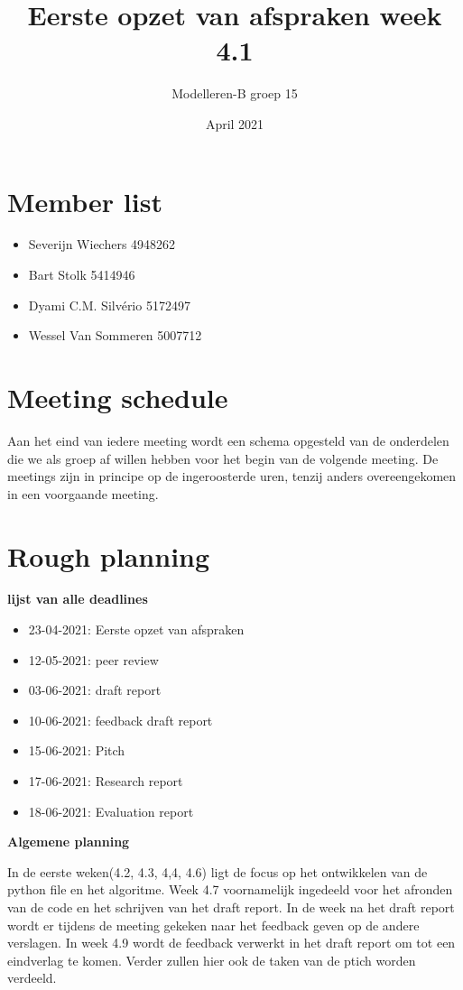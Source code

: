 \documentclass{article}
\title{Eerste opzet van afspraken week 4.1}
\author{Modelleren-B groep 15}
\date{April 2021}
\begin{document}
\maketitle

\section*{Member list}

\begin{itemize}
    \item Severijn Wiechers 4948262
    \item Bart Stolk 5414946
    \item Dyami C.M. Silvério 5172497
    \item Wessel Van Sommeren 5007712
\end{itemize}


\section*{Meeting schedule} 

Aan het eind van iedere meeting wordt een schema opgesteld van de onderdelen die we als groep af willen hebben voor het begin van de volgende meeting. De meetings zijn in principe op de ingeroosterde uren, tenzij anders overeengekomen in een voorgaande meeting. 


\section*{Rough planning}
\textbf{lijst van alle deadlines}
\begin{itemize}
    \item 23-04-2021: Eerste opzet van afspraken
    \item 12-05-2021: peer review
    \item 03-06-2021: draft report
    \item 10-06-2021: feedback draft report
    \item 15-06-2021: Pitch
    \item 17-06-2021: Research report
    \item 18-06-2021: Evaluation report 
\end{itemize}
\textbf{Algemene planning}

In de eerste weken(4.2, 4.3, 4,4, 4.6) ligt de focus op het ontwikkelen van de python file en het algoritme. Week 4.7 voornamelijk ingedeeld voor het afronden van de code en het schrijven van het draft report. In de week na het draft report wordt er tijdens de meeting gekeken naar het feedback geven op de andere verslagen. In week 4.9 wordt de feedback verwerkt in het draft report om tot een eindverlag te komen. Verder zullen hier ook de taken van de ptich worden verdeeld.
\end{document}
